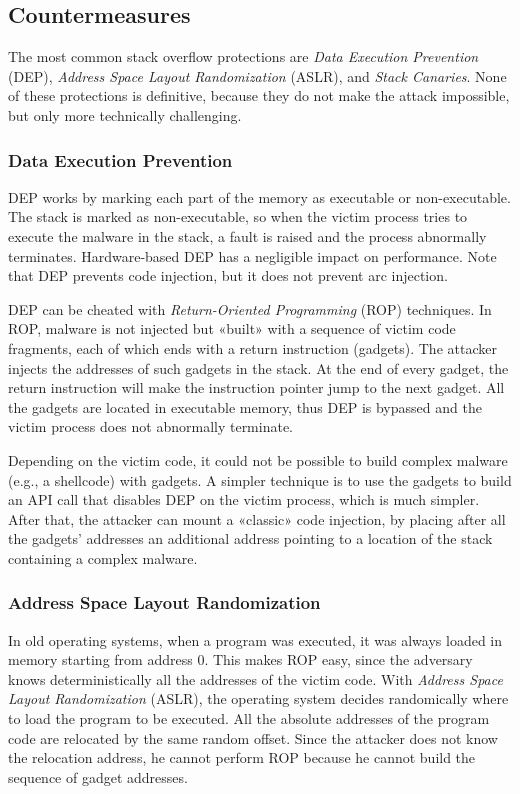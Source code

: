 \documentclass[a4paper,12pt]{article}
\begin{document}
\subsection{Countermeasures}
The most common stack overflow protections are \textit{Data Execution Prevention} (DEP), \textit{Address Space Layout Randomization} (ASLR), and \textit{Stack Canaries}. None of these protections is definitive, because they do not make the attack impossible, but only more technically challenging.

\subsubsection{Data Execution Prevention}
DEP works by marking each part of the memory as executable or non-executable. The stack is marked as non-executable, so when the victim process tries to execute the malware in the stack, a fault is raised and the process abnormally terminates. Hardware-based DEP has a negligible impact on performance. Note that DEP prevents code injection, but it does not prevent arc injection.

DEP can be cheated with \textit{Return-Oriented Programming} (ROP) techniques. In ROP, malware is not injected but «built» with a sequence of victim code fragments, each of which ends with a return instruction (gadgets). The attacker injects the addresses of such gadgets in the stack. At the end of every gadget, the return instruction will make the instruction pointer jump to the next gadget. All the gadgets are located in executable memory, thus DEP is bypassed and the victim process does not abnormally terminate.

Depending on the victim code, it could not be possible to build complex malware (e.g., a shellcode) with gadgets. A simpler technique is to use the gadgets to build an API call that disables DEP on the victim process, which is much simpler. After that, the attacker can mount a «classic» code injection, by placing after all the gadgets’ addresses an additional address pointing to a location of the stack containing a complex malware.

\subsubsection{Address Space Layout Randomization}
In old operating systems, when a program was executed, it was always loaded in memory starting from address 0. This makes ROP easy, since the adversary knows deterministically all the addresses of the victim code. With \textit{Address Space Layout Randomization} (ASLR), the operating system decides randomically where to load the program to be executed. All the absolute addresses of the program code are relocated by the same random offset. Since the attacker does not know the relocation address, he cannot perform ROP because he cannot build the sequence of gadget addresses.
\end{document}
